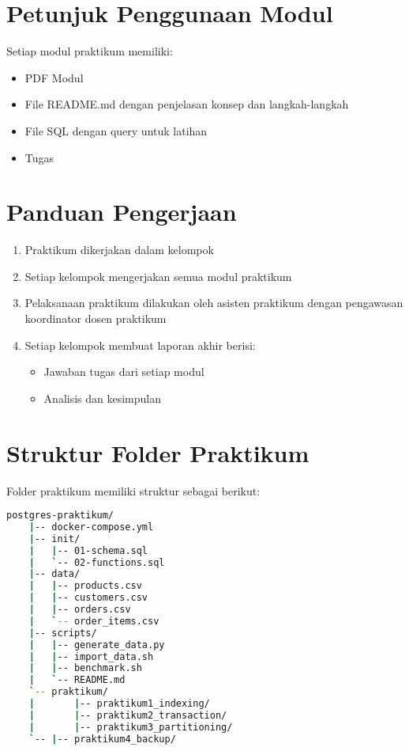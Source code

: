 \section{Petunjuk Penggunaan Modul}

Setiap modul praktikum memiliki:
\begin{itemize}
    \item PDF Modul
    \item File README.md dengan penjelasan konsep dan langkah-langkah
    \item File SQL dengan query untuk latihan
    \item Tugas 
\end{itemize}

\section{Panduan Pengerjaan}

\begin{enumerate}
    \item Praktikum dikerjakan dalam kelompok 
    \item Setiap kelompok mengerjakan semua modul praktikum
    \item Pelaksanaan praktikum dilakukan oleh asisten praktikum dengan pengawasan koordinator dosen praktikum
    \item Setiap kelompok membuat laporan akhir berisi:
    \begin{itemize}
        \item Jawaban tugas dari setiap modul
        \item Analisis dan kesimpulan
    \end{itemize}
\end{enumerate}

\section{Struktur Folder Praktikum}

Folder praktikum memiliki struktur sebagai berikut:

\begin{lstlisting}[language=bash,basicstyle=\ttfamily\small]
	postgres-praktikum/
	|-- docker-compose.yml           
	|-- init/                         
	|   |-- 01-schema.sql            
	|   `-- 02-functions.sql        
	|-- data/                       
	|   |-- products.csv             
	|   |-- customers.csv           
	|   |-- orders.csv            
	|   `-- order_items.csv           
	|-- scripts/                    
	|   |-- generate_data.py          
	|   |-- import_data.sh           
	|   |-- benchmark.sh             
	|   `-- README.md               
	`-- praktikum/                   
	|		|-- praktikum1_indexing/      
	|		|-- praktikum2_transaction/ 
	|		|-- praktikum3_partitioning/ 
	`--	|-- praktikum4_backup/    
\end{lstlisting}

